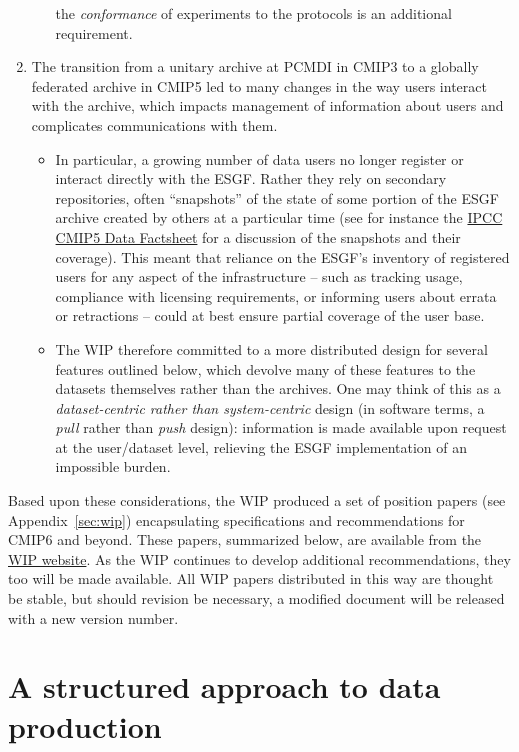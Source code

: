 \documentclass[gmd,manuscript]{copernicus}
\newcommand{\pipref}[1] {\citep{ref:#1}}
\newcommand{\appref}[1] {\mbox{Appendix \ref{sec:#1}}}
\begin{document}
\begin{enumerate}
\begin{itemize}
   the \emph{conformance} of experiments to the protocols
   \pipref{lawrenceetal2012} is an additional requirement.
  \end{itemize}
\item\label{snap} The transition from a unitary archive at PCMDI in
  CMIP3 to a globally federated archive in CMIP5 led to many changes
  in the way users interact with the archive, which impacts management
  of information about users and complicates communications with them.
  \begin{itemize}
  \item In particular, a growing number of data users no longer
    register or interact directly with the ESGF. Rather they rely on
    secondary repositories, often ``snapshots'' of the state of some
    portion of the ESGF archive created by others at a particular time
    (see for instance the \href{https://goo.gl/34AtW6}{IPCC CMIP5 Data
      Factsheet} for a discussion of the snapshots and their
    coverage). This meant that reliance on the ESGF's inventory of
    registered users for any aspect of the infrastructure -- such as
    tracking usage, compliance with licensing requirements, or
    informing users about errata or retractions -- could at best
    ensure partial coverage of the user base.
  \item The WIP therefore committed to a more distributed design for
    several features outlined below, which devolve many of these
    features to the datasets themselves rather than the archives. One
    may think of this as a \emph{dataset-centric rather than
      system-centric} design (in software terms, a \emph{pull} rather
    than \emph{push} design): information is made available upon
    request at the user/dataset level, relieving the ESGF
    implementation of an impossible burden.
  \end{itemize}
\end{enumerate}

Based upon these considerations, the WIP produced a set of position
papers (see \appref{wip}) encapsulating specifications and
recommendations for CMIP6 and beyond. These papers, summarized below,
are available from the
\href{https://www.earthsystemcog.org/projects/wip/}{WIP website}. As
the WIP continues to develop additional recommendations, they too will
be made available. All WIP papers distributed in this way are thought
be stable, but should revision be necessary, a modified document will
be released with a new version number.

\section{A structured approach to data production}
\label{sec:dreq}
\end{document}
